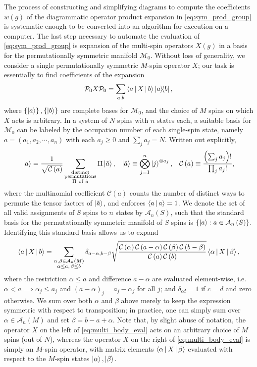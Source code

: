 \documentclass[nofootinbib,notitlepage,11pt]{revtex4-2}
\renewcommand{\t}{\text} %
\newcommand{\f}[2]{\dfrac{#1}{#2}} %
\newcommand{\p}[1]{\left(#1\right)} %
\renewcommand{\set}[1]{\left\{#1\right\}} %
\newcommand{\bk}{\Braket} %
\newcommand{\1}{\mathds{1}}
\newcommand{\A}{\mathcal{A}}
\newcommand{\C}{\mathcal{C}}
\newcommand{\M}{\mathcal{M}}
\renewcommand{\P}{\mathcal{P}}
\begin{document}
The process of constructing and simplifying diagrams to compute the
coefficients $w\p{g}$ of the diagrammatic operator product expansion
in \eqref{eq:sym_prod_group} is systematic enough to be converted into
an algorithm for execution on a computer.  The last step necessary to
automate the evaluation of \eqref{eq:sym_prod_group} is expansion of
the multi-spin operators $X\p{g}$ in a basis for the permutationally
symmetric manifold $\M_0$.  Without loss of generality, we consider a
single permutationally symmetric $M$-spin operator $X$; our task is
essentially to find coefficients of the expansion
\begin{align}
  \P_0 X \P_0
  = \sum_{a,b} \bk{a|X|b} \op{a}{b},
\end{align}
where $\set{\ket{a}},\set{\ket{b}}$ are complete bases for $\M_0$, and
the choice of $M$ spins on which $X$ acts is arbitrary.  In a system
of $N$ spins with $n$ states each, a suitable basis for $\M_0$ can be
labeled by the occupation number of each single-spin state, namely
$a=\p{a_1,a_2,\cdots,a_n}$ with each $a_j\ge 0$ and $\sum_ja_j=N$.
Written out explicitly,
\begin{align}
  \ket{a} = \f1{\sqrt{\C\p{a}}}
  \sum_{\substack{\t{distinct}\\\t{permutations}\\\Pi~\t{of}~\tilde a}}
  \Pi \ket{\tilde a},
  &&
  \ket{\tilde a} \equiv \bigotimes_{j=1}^n \ket{j}^{\otimes a_j},
  &&
  \C\p{a} \equiv \f{\p{\sum_j a_j}!}{\prod_ja_j!},
\end{align}
where the multinomial coefficient $\C\p{a}$ counts the number of
distinct ways to permute the tensor factors of $\ket{\tilde a}$, and
enforces $\bk{a|a}=1$.  We denote the set of all valid assignments of
$S$ spins to $n$ states by $\A_n\p{S}$, such that the standard basis
for the permutationally symmetric manifold of $S$ spins is
$\set{\ket{a}:a\in\A_n\p{S}}$.  Identifying this standard basis allows
us to expand
\begin{align}
  \bk{a|X|b}
  = \sum_{\substack{\alpha,\beta\in\A_n\p{M}\\\alpha\le a,\,\beta\le b}}
  \delta_{a-\alpha,b-\beta}
  \sqrt{\f{\C\p{\alpha}\C\p{a-\alpha}\C\p{\beta}\C\p{b-\beta}}
    {\C\p{a}\C\p{b}}}
  \bk{\alpha|X|\beta},
  \label{eq:multi_body_eval}
\end{align}
where the restriction $\alpha\le a$ and difference $a-\alpha$ are
evaluated element-wise, i.e.~$\alpha<a\implies \alpha_j\le a_j$ and
$\p{a-\alpha}_j=a_j-\alpha_j$ for all $j$; and $\delta_{cd}=1$ if
$c=d$ and zero otherwise.  We sum over both $\alpha$ and $\beta$ above
merely to keep the expression symmetric with respect to transposition;
in practice, one can simply sum over $\alpha\in\A_n\p{M}$ and set
$\beta=b-a+\alpha$.  Note that, by slight abuse of notation, the
operator $X$ on the left of \eqref{eq:multi_body_eval} acts on an
arbitrary choice of $M$ spins (out of $N$), whereas the operator $X$
on the right of \eqref{eq:multi_body_eval} is simply an $M$-spin
operator, with matrix elements $\bk{\alpha|X|\beta}$ evaluated with
respect to the $M$-spin states $\ket\alpha,\ket\beta$.
\end{document}
